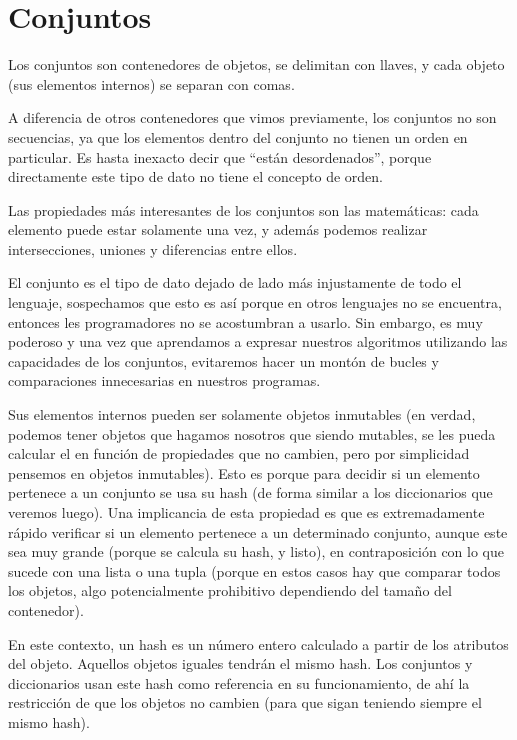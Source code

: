 \section{Conjuntos}

Los conjuntos son contenedores de objetos, se delimitan con llaves, y cada objeto (sus elementos internos) se separan con comas.

A diferencia de otros contenedores que vimos previamente, los conjuntos no son secuencias, ya que los elementos dentro del conjunto no tienen un orden en particular. Es hasta inexacto decir que ``están desordenados'', porque directamente este tipo de dato no tiene el concepto de orden.

Las propiedades más interesantes de los conjuntos son las matemáticas: cada elemento puede estar solamente una vez, y además podemos realizar intersecciones, uniones y diferencias entre ellos.


El conjunto es el tipo de dato dejado de lado más injustamente de todo el lenguaje, sospechamos que esto es así porque en otros lenguajes no se encuentra, entonces les programadores no se acostumbran a usarlo. Sin embargo, es muy poderoso y una vez que aprendamos a expresar nuestros algoritmos utilizando las capacidades de los conjuntos, evitaremos hacer un montón de bucles y comparaciones innecesarias en nuestros programas.

Sus elementos internos pueden ser solamente objetos inmutables (en verdad, podemos tener objetos que hagamos nosotros que siendo mutables, se les pueda calcular el  en función de propiedades que no cambien, pero por simplicidad pensemos en objetos inmutables). Esto es porque para decidir si un elemento pertenece a un conjunto se usa su hash (de forma similar a los diccionarios que veremos luego). Una implicancia de esta propiedad es que es extremadamente rápido verificar si un elemento pertenece a un determinado conjunto, aunque este sea muy grande (porque se calcula su hash, y listo), en contraposición con lo que sucede con una lista o una tupla (porque en estos casos hay que comparar todos los objetos, algo potencialmente prohibitivo dependiendo del tamaño del contenedor).

\begin{info}
En este contexto, un hash es un número entero calculado a partir de los atributos del objeto. Aquellos objetos iguales tendrán el mismo hash. Los conjuntos y diccionarios usan este hash como referencia en su funcionamiento, de ahí la restricción de que los objetos no cambien (para que sigan teniendo siempre el mismo hash).
\end{info}

